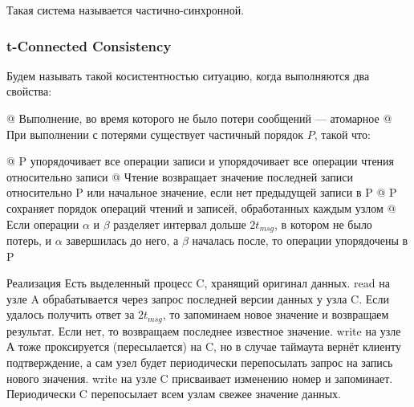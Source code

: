 Такая система называется частично-синхронной.


\subsubsection{t-Connected Consistency}
Будем называть такой косистентностью ситуацию, когда выполняются два свойства:
\begin{el}[ul]
@ Выполнение, во время которого не было потери сообщений --- атомарное
@ При выполнении с потерями существует частичный порядок $P$, такой что:
\begin{el}[ol]
@ P упорядочивает все операции записи и упорядочивает все операции чтения относительно записи
@ Чтение возвращает значение последней записи относительно P или начальное значение, если нет предыдущей записи в P
@ P сохраняет порядок операций чтений и записей, обработанных каждым узлом
@ Если операции $\alpha$ и $\beta$ разделяет интервал дольше $2 t_{msg}$, в котором не было потерь, и $\alpha$ завершилась до него, а $\beta$ началась после, то операции упорядочены в P
\end{el}
\end{el}


Реализация
Есть выделенный процесс C, хранящий оригинал данных.
read на узле A обрабатывается через запрос последней версии данных у узла C. Если удалось получить ответ за $2 t_{msg}$, то запоминаем новое значение и возвращаем результат. Если нет, то возвращаем последнее известное значение.
write на узле А тоже проксируется (пересылается) на C, но в случае таймаута вернёт клиенту подтверждение, а сам узел будет периодически перепосылать запрос на запись нового значения.
write на узле C присваивает изменению номер и запоминает.
Периодически C перепосылает всем узлам свежее значение данных.

